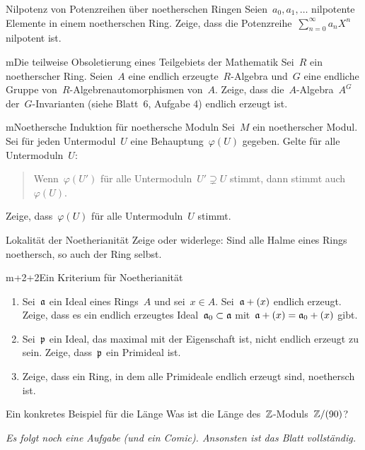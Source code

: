 \documentclass[entwurf]{uebblatt}
\begin{document}

\begin{aufgabe}{2}{Nilpotenz von Potenzreihen über noetherschen Ringen}
Seien~$a_0, a_1, \ldots$ nilpotente Elemente in einem noetherschen Ring. Zeige,
dass die Potenzreihe~$\sum_{n=0}^\infty a_n X^n$ nilpotent ist.
\end{aufgabe}

\begin{aufgabe}{m}{Die teilweise Obsoletierung eines Teilgebiets der Mathematik}
Sei~$R$ ein noetherscher Ring. Seien~$A$ eine
endlich erzeugte~$R$-Algebra und~$G$ eine endliche Gruppe von~$R$-Algebrenautomorphismen
von~$A$. Zeige, dass die~$A$-Algebra~$A^G$ der~$G$-Invarianten (siehe Blatt~6,
Aufgabe 4) endlich erzeugt ist.
\end{aufgabe}

\begin{aufgabe}{m}{Noethersche Induktion für noethersche Moduln}
Sei~$M$ ein noetherscher Modul. Sei für jeden Untermodul~$U$ eine
Behauptung~$\varphi(U)$ gegeben. Gelte für alle Untermoduln~$U$:
\begin{quote}Wenn~$\varphi(U')$ für alle Untermoduln~$U'
\supsetneq U$ stimmt, dann stimmt auch~$\varphi(U)$.\end{quote}
Zeige, dass~$\varphi(U)$ für alle Untermoduln~$U$ stimmt.
\end{aufgabe}

\begin{aufgabe}{2}{Lokalität der Noetherianität}
Zeige oder widerlege: Sind alle Halme eines Rings noethersch, so auch der Ring
selbst.
\end{aufgabe}

\begin{aufgabe}{m+2+2}{Ein Kriterium für Noetherianität}
\begin{enumerate}
\item Sei~$\mathfrak{a}$ ein Ideal eines Rings~$A$ und sei~$x \in A$. Sei~$\mathfrak{a} + (x)$
endlich erzeugt. Zeige, dass es ein endlich erzeugtes Ideal~$\mathfrak{a}_0 \subset \mathfrak{a}$
mit~$\mathfrak{a} + (x) = \mathfrak{a}_0 + (x)$ gibt.
\item Sei~$\mathfrak{p}$ ein Ideal, das maximal mit der Eigenschaft ist,
nicht endlich erzeugt zu sein. Zeige, dass~$\mathfrak{p}$ ein Primideal ist.
\item Zeige, dass ein Ring, in dem alle Primideale endlich erzeugt sind,
noethersch ist.
\end{enumerate}
\end{aufgabe}

\begin{aufgabe}{2}{Ein konkretes Beispiel für die Länge}
Was ist die Länge des~$\mathbb{Z}$-Moduls~$\mathbb{Z}/(90)$?
\end{aufgabe}

\centering
\emph{Es folgt noch eine Aufgabe (und ein Comic). Ansonsten ist das Blatt
vollständig.}
\par
\end{document}
